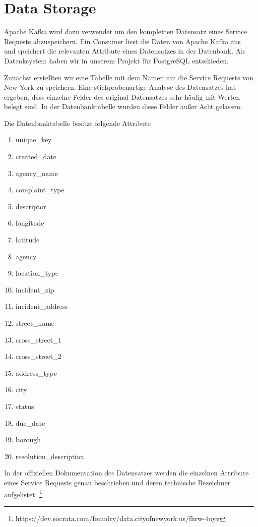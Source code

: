 \section{Data Storage}
Apache Kafka wird dazu verwendet um den kompletten Datensatz eines Service Requests abzuspeichern.
Ein Consumer liest die Daten von Apache Kafka aus und speichert die relevanten Attribute eines Datensatzes in der Datenbank.
Als Datenksystem haben wir in unserem Projekt für PostgreSQL entschieden.

Zunächst erstellten wir eine Tabelle mit dem Namen  um die Service Requests von New York zu speichern.
Eine stichprobenartige Analyse des Datensatzes hat ergeben, dass einzelne Felder des original Datensatzes sehr häufig mit 
Werten belegt sind.
In der Datenbanktabelle  wurden diese Felder außer Acht gelassen.

Die Datenbanktabelle besitzt folgende Attribute
\begin{enumerate}
  \item unique\_key
  \item created\_date
  \item agency\_name
  \item complaint\_type
  \item descriptor
  \item longitude
  \item latitude
  \item agency
  \item location\_type
  \item incident\_zip
  \item incident\_address
  \item street\_name
  \item cross\_street\_1
  \item cross\_street\_2
  \item address\_type
  \item city
  \item status
  \item due\_date
  \item borough
  \item resolution\_description
\end{enumerate}

In der offiziellen Dokumentation des Datensatzes werden die einzelnen Attribute
eines Service Requests genau beschrieben und deren technische Bezeichner aufgelistet.
\footnote{https://dev.socrata.com/foundry/data.cityofnewyork.us/fhrw-4uyv}

